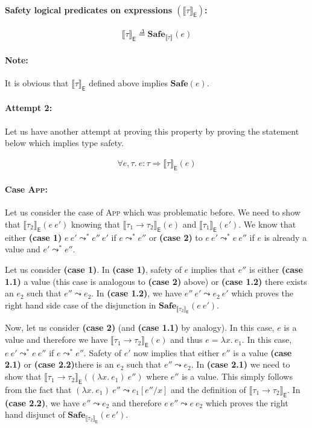 \documentclass{article}
\newcommand{\EXP}{\mathsf{E}}
\newcommand{\defeq}{\overset{\Delta}{=}}
\newcommand{\semtyp}[2]{\llbracket #2 \rrbracket_{#1}}
\begin{document}
\paragraph{Safety logical predicates on expressions $\left(\semtyp{\EXP}{\tau}\right)$:}
\[
\semtyp{\EXP}{\tau} \defeq \mathbf{Safe}_{\semtyp{}{\tau}}(e)
\]

\paragraph{Note:} It is obvious that $\semtyp{\EXP}{\tau}$
defined above implies $\mathbf{Safe}(e)$.

\paragraph{Attempt 2:} Let us have another attempt at proving this property by proving
the statement below which implies type safety.

\begin{align*}
\label{secatt}
\forall e, \tau.~e : \tau \Rightarrow \semtyp{\EXP}{\tau}(e)
\end{align*}

\paragraph{Case \textsc{App}:}
Let us consider the case of \textsc{App} which was problematic before.
We need to show that $\semtyp{\EXP}{\tau_2}(e~e')$ knowing that
$\semtyp{\EXP}{\tau_1 \to \tau_2}(e)$ and $\semtyp{\EXP}{\tau_1}(e')$.
We know that either \textbf{(case 1)} $e~e' \leadsto^* e''~e'$ if $e \leadsto^* e''$
or \textbf{(case 2)} to $e~e' \leadsto^* e~e''$ if $e$ is already a value and $e' \leadsto^* e''$.

Let us consider \textbf{(case 1)}.
In \textbf{(case 1)}, safety of $e$ implies that $e''$ is either \textbf{(case 1.1)} a value (this case is analogous to \textbf{(case 2)} above) or \textbf{(case 1.2)} there exists an $e_2$ such that $e'' \leadsto e_2$. In \textbf{(case 1.2)}, we have $e''~e' \leadsto e_2~e'$ which proves
the right hand side case of the disjunction in $\mathbf{Safe}_{\semtyp{\EXP}{\tau_2}}(e~e')$.

Now, let us consider \textbf{(case 2)} (and \textbf{(case 1.1)} by analogy). In this case, $e$ is
a value and therefore we have $\semtyp{\EXP}{\tau_1 \to \tau_2}(e)$ and thus $e = \lambda x.~e_1$.
In this case, $e~e' \leadsto^* e~e''$ if $e \leadsto^* e''$. Safety of $e'$ now implies that
either $e''$ is a value \textbf{(case 2.1)} or \textbf{(case 2.2)}there is an $e_2$ such that
$e'' \leadsto e_2$.
In \textbf{(case 2.1)} we need to show that $\semtyp{\EXP}{\tau_1 \to \tau_2}((\lambda x.~e_1)~e'')$ where $e''$ is a value. This simply follows from the fact that $(\lambda x.~e_1)~e'' \leadsto e_1[e''/x]$ and the definition of $\semtyp{\EXP}{\tau_1 \to \tau_2}$.
In \textbf{(case 2.2)}, we have $e'' \leadsto e_2$ and therefore $e~e'' \leadsto e~e_2$ which
proves the right hand disjunct of $\mathbf{Safe}_{\semtyp{\EXP}{\tau_2}}(e~e')$.
\end{document}

